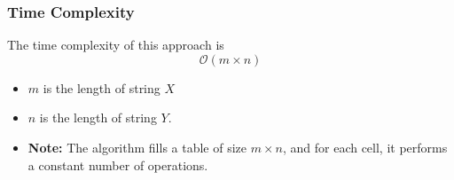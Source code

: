 \subsubsection{Time Complexity}
\begin{definition}
    The time complexity of this approach is 
    \begin{equation}
        \mathcal{O}(m \times n)
    \end{equation}
    \begin{itemize}
        \item \(m\) is the length of string \(X\)
        \item \(n\) is the length of string \(Y\). 
        \item \textbf{Note:} The algorithm fills a table of size \(m \times n\), and for each cell, it performs a constant number of operations.
    \end{itemize}
\end{definition}